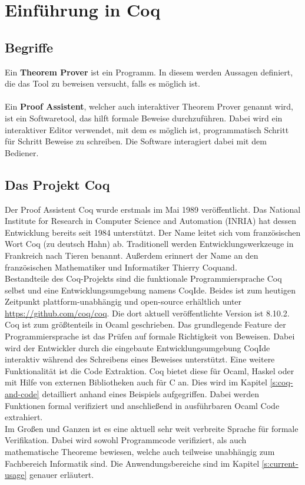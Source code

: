 \section{Einführung in Coq}
\subsection{Begriffe}
Ein \textbf{Theorem Prover} ist ein Programm.
In diesem werden Aussagen definiert, die das Tool zu beweisen versucht, falls es möglich ist.\\
\\
Ein \textbf{Proof Assistent}, welcher auch interaktiver Theorem Prover genannt wird, ist ein Softwaretool, das hilft formale Beweise durchzuführen. Dabei wird ein interaktiver Editor verwendet, mit dem es möglich ist, programmatisch Schritt für Schritt Beweise zu schreiben. Die Software interagiert dabei mit dem Bediener.
 

\subsection{Das Projekt Coq}
Der Proof Assistent Coq wurde erstmals im Mai 1989 veröffentlicht. Das National Institute for Research in Computer Science and Automation (INRIA) hat dessen Entwicklung bereits seit 1984 unterstützt.\cite{COQ02:FV} Der Name leitet sich vom französischen Wort Coq (zu deutsch Hahn) ab. Traditionell werden Entwicklungswerkzeuge in Frankreich nach Tieren benannt. Außerdem erinnert der Name an den französischen Mathematiker und Informatiker Thierry Coquand. \\
Bestandteile des Coq-Projekts sind die funktionale Programmiersprache Coq selbst und eine Entwicklungsumgebung namens CoqIde. Beides ist zum heutigen Zeitpunkt plattform-unabhängig und open-source erhältlich unter \url{https://github.com/coq/coq}. Die dort aktuell veröffentlichte Version ist 8.10.2.\cite{COQ01:FV}\\
Coq ist zum größtenteils in Ocaml geschrieben. Das grundlegende Feature der Programmiersprache ist das Prüfen auf formale Richtigkeit von Beweisen. Dabei wird der Entwickler durch die eingebaute Entwicklungsumgebung CoqIde interaktiv während des Schreibens eines Beweises unterstützt. Eine weitere Funktionalität ist die Code Extraktion. Coq bietet diese für Ocaml, Haskel oder mit Hilfe von externen Bibliotheken auch für C an. Dies wird im Kapitel \ref{s:coq-and-code} detailliert anhand eines Beispiels aufgegriffen. Dabei werden Funktionen formal verifiziert und anschließend in ausführbaren Ocaml Code extrahiert.\\
Im Großen und Ganzen ist es eine aktuell sehr weit verbreite Sprache für formale Verifikation. Dabei wird sowohl Programmcode verifiziert, als auch mathematische Theoreme bewiesen, welche auch teilweise unabhängig zum Fachbereich Informatik sind. Die Anwendungsbereiche sind im Kapitel \ref{s:current-usage} genauer erläutert.

